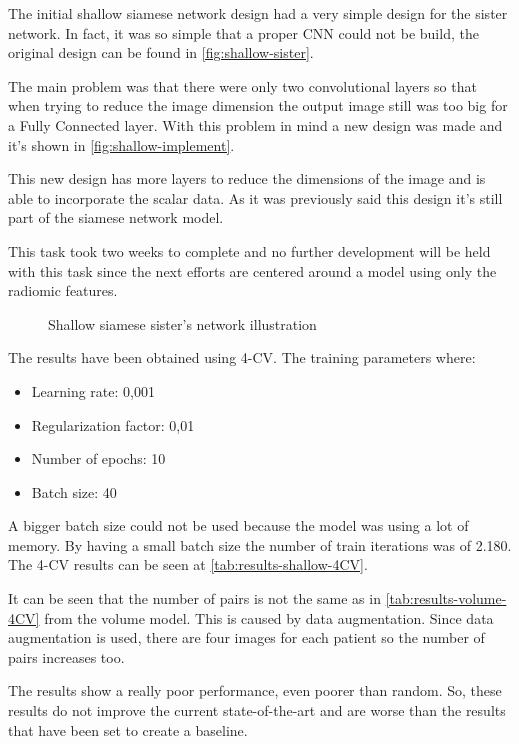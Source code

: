 \label{sec:shallow-siamese}

The initial shallow siamese network design had a very simple design for the sister network. 
In fact, it was so simple that a proper \gls{CNN} could not be build, the original design 
can be found in \autoref{fig:shallow-sister}.

The main problem was that there were only two convolutional layers so that when trying to reduce
the image dimension the output image still was too big for a Fully Connected layer. With this
problem in mind a new design was made and it's shown in \autoref{fig:shallow-implement}.

This new design has more layers to reduce the dimensions of the image and is able to 
incorporate the scalar data. As it was previously said this design it's still part of the
siamese network model.

This task took two weeks to complete and no further development will be held with this task
since the next efforts are centered around a model using only the radiomic features.

\begin{figure}
  \centering
  
  \caption{Shallow siamese sister's network illustration \label{fig:shallow-implement}}
\end{figure}


The results have been obtained using 4-\gls{CV}. The training parameters where:
\begin{itemize}
  \item Learning rate: 0,001
  \item Regularization factor: 0,01
  \item Number of epochs: 10
  \item Batch size: 40
\end{itemize}
A bigger batch size could not be used because
the model was using a lot of memory. By having a small batch size the number of train 
iterations was of 2.180. The 4-\gls{CV} results can be seen at \autoref{tab:results-shallow-4CV}.

It can be seen that the number of pairs is not the same as in \autoref{tab:results-volume-4CV} 
from the volume model. This is caused by data augmentation. Since
data augmentation is used, there are four images for each patient so the number of pairs
increases too.

The results show a really poor performance, even poorer than random. So, these results
do not improve the current state-of-the-art and are worse than the results that have 
been set to create a baseline. 

